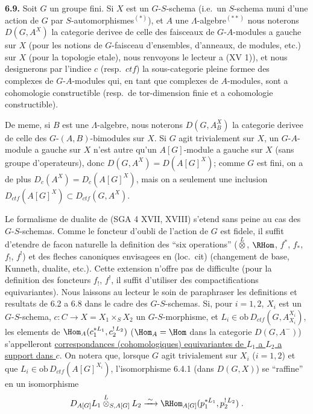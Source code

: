 \medskip
\noindent\textbf{6.9.} Soit $G$ un groupe fini. Si $X$ est un $G$-$S$-schema (i.e.\ un $S$-schema muni d'une action de $G$ par $S$-automorphismes$^{(*)}$), et $A$ une $\Lambda$-algebre$^{(**)}$ nous noterons $D(G,A^X)$ la categorie derivee de celle des faisceaux de $G$-$A$-modules a gauche sur $X$ (pour les notions de $G$-faisceau d'ensembles, d'anneaux, de modules, etc.) sur $X$ (pour la topologie etale), nous renvoyons le lecteur a (XV 1)), et nous designerons par l'indice $c$ (resp.\ $ctf$) la sous-categorie pleine formee des complexes de $G$-$A$-modules qui, en tant que complexes de $A$-modules, sont a cohomologie constructible (resp.\ de tor-dimension finie et a cohomologie constructible).

De meme, si $B$ est une $\Lambda$-algebre, nous noterons $D(G,A_B^X)$ la categorie derivee de celle des $G$-$(A,B)$-bimodules sur $X$. Si $G$ agit trivialement sur $X$, un $G$-$A$-module a gauche sur $X$ n'est autre qu'un $A[G]$-module a gauche sur $X$ (sans groupe d'operateurs), donc $D(G,A^X) = D(A[G]^X)$; comme $G$ est fini, on a de plus $D_c(A^X) = D_c(A[G]^X)$, mais on a seulement une inclusion $D_{ctf}(A[G]^X) \subset D_{ctf}(G,A^X)$.

Le formalisme de dualite de (SGA 4 XVII, XVIII) s'etend sans peine au cas des $G$-$S$-schemas. Comme le foncteur d'oubli de l'action de $G$ est fidele, il suffit d'etendre de facon naturelle la definition des ``six operations'' ($\overset{L}{\otimes}$, $\RHom$, $f^*$, $f_*$, $f_!$, $f^!$) et des fleches canoniques envisagees en (loc.\ cit) (changement de base, Kunneth, dualite, etc.). Cette extension n'offre pas de difficulte (pour la definition des foncteurs $f_!$, $f^!$, il suffit d'utiliser des compactifications equivariantes). Nous laissons au lecteur le soin de paraphraser les definitions et resultats de 6.2 a 6.8 dans le cadre des $G$-$S$-schemas. Si, pour $i=1,2$, $X_i$ est un $G$-$S$-schema, $c : C \longrightarrow X = X_1 \times_S X_2$ un $G$-$S$-morphisme, et $L_i \in \mathrm{ob}\, D_{ctf}(G, A_{X_i}^{X_i})$, les elements de $\Hom_A(c_1^{*L_1}, c_2^{!\,L_2})$ ($\Hom_A = \Hom$ dans la categorie $D(G, A^-)$) s'appelleront \underline{correspondances (cohomologiques) equivariantes de $L_1$ a $L_2$ a support dans $c$}. On notera que, lorsque $G$ agit trivialement sur $X_i$ ($i=1,2$) et que $L_i \in \mathrm{ob}\, D_{ctf}(A[G]^{X_i})$, l'isomorphisme 6.4.1 (dans $D(G,X)$) se ``raffine'' en un isomorphisme
\[
D_{A[G]}L_1 \overset{L}{\otimes}_{S,A[G]} L_2 \xrightarrow{\;\sim\;} \RHom_{A[G]}(p_1^{*L_1}, p_2^{!\,L_2})\;.
\]

